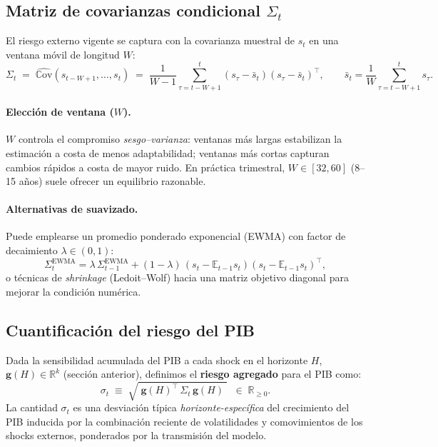 \documentclass[11pt,a4paper]{article}
\newcommand{\E}{\mathbb{E}}
\newcommand{\Cov}{\mathbb{C}\text{ov}}
\newcommand{\R}{\mathbb{R}}
\newcommand{\1}{\mathbf{1}}
\newcommand{\vect}[1]{\boldsymbol{#1}}
\begin{document}
\subsection{Matriz de covarianzas condicional \texorpdfstring{$\Sigma_t$}{Σ\_t}}

El riesgo externo vigente se captura con la covarianza muestral de $s_t$ en una ventana móvil de longitud $W$:
\begin{equation}
\label{eq:Sigma_roll}
\Sigma_t
\;=\;
\widehat{\Cov}\!\left(s_{t-W+1},\ldots,s_t\right)
\;=\;
\frac{1}{W-1}\sum_{\tau=t-W+1}^{t}\left(s_\tau-\bar{s}_t\right)\left(s_\tau-\bar{s}_t\right)^\top,
\qquad
\bar{s}_t=\frac{1}{W}\sum_{\tau=t-W+1}^{t}s_\tau.
\end{equation}

\paragraph{Elección de ventana ($W$).}
$W$ controla el compromiso \emph{sesgo--varianza}: ventanas más largas estabilizan la estimación a costa de menos adaptabilidad; ventanas más cortas capturan cambios rápidos a costa de mayor ruido. En práctica trimestral, $W\in[32,60]$ (8--15 años) suele ofrecer un equilibrio razonable.

\paragraph{Alternativas de suavizado.}
Puede emplearse un promedio ponderado exponencial (EWMA) con factor de decaimiento $\lambda\in(0,1)$:
\[
\Sigma^{\text{EWMA}}_t=\lambda\,\Sigma^{\text{EWMA}}_{t-1}+(1-\lambda)\,(s_t-\E_{t-1}s_t)(s_t-\E_{t-1}s_t)^\top,
\]
o técnicas de \emph{shrinkage} (Ledoit--Wolf) hacia una matriz objetivo diagonal para mejorar la condición numérica.

\subsection{Cuantificación del riesgo del PIB}

Dada la sensibilidad acumulada del PIB a cada shock en el horizonte $H$, $\vect{g}(H)\in\mathbb{R}^{k}$ (sección anterior), definimos el \textbf{riesgo agregado} para el PIB como:
\begin{equation}
\label{eq:sigma_def}
\sigma_t
\;\equiv\;
\sqrt{\;\vect{g}(H)^\top \,\Sigma_t\, \vect{g}(H)\;}
\;\;\in\;\R_{\ge 0}.
\end{equation}
La cantidad $\sigma_t$ es una desviación típica \emph{horizonte-específica} del crecimiento del PIB inducida por la combinación reciente de volatilidades y comovimientos de los shocks externos, ponderados por la transmisión del modelo.
\end{document}
